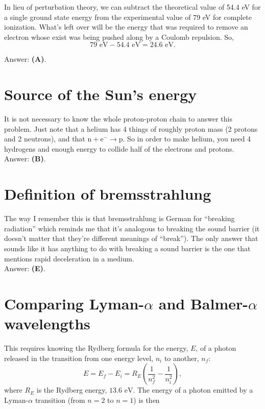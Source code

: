 \documentclass[11pt]{paper}
\newcommand{\answer}[1]{Answer: \textbf{(#1)}.}
\begin{document}
In lieu of perturbation theory, we can subtract the theoretical value of 54.4 eV for a single ground state energy from the experimental value of 79 eV for complete ionization.  What's left over will be the energy that was required to remove an electron whose exist was being pushed along by a Coulomb repulsion.  So, 
\begin{equation}
79 \text{ eV} - 54.4 \text{ eV} = 24.6 \text{ eV}.
\end{equation}

\answer{A}

\section{Source of the Sun's energy}
It is not necessary to know the whole proton-proton chain to answer this problem.  Just note that a helium has 4 things of roughly proton mass (2 protons and 2 neutrons), and that $\text{n} + \text{e}^- \rightarrow \text{p}$.  So in order to make helium, you need 4 hydrogens and enough energy to collide half of the electrons and protons.\\

\answer{B}

\section{Definition of bremsstrahlung}
The way I remember this is that bremsstrahlung is German for ``breaking radiation'' which reminds me that it's analogous to breaking the sound barrier (it doesn't matter that they're different meanings of ``break'').  The only answer that sounds like it has anything to do with breaking a sound barrier is the one that mentions rapid deceleration in a medium.\\

\answer{E}

\section{Comparing Lyman-$\alpha$ and Balmer-$\alpha$ wavelengths}
This requires knowing the Rydberg formula for the energy, $E$, of a photon released in the transition from one energy level, $n_i$ to another, $n_f$:
\begin{equation}
E = E_f - E_i = R_E \left(\frac{1}{n_f^2} - \frac{1}{n_i^2}\right),
\end{equation}
where $R_E$ is the Rydberg energy, $13.6 \text{ eV}$.  The energy of a photon emitted by a Lyman-$\alpha$ transition (from $n=2$ to $n=1$) is then
\end{document}
